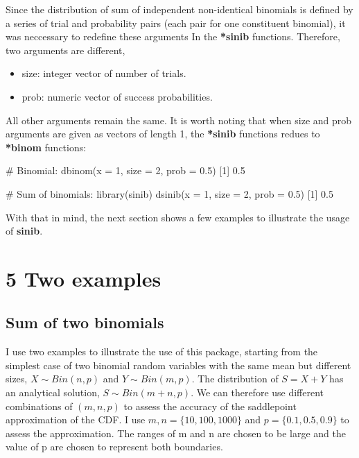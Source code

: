 Since the distribution of sum of independent non-identical binomials is defined by a series of trial and probability pairs (each pair for one constituent binomial), it was neccessary to redefine these arguments  In the \textbf{*sinib} functions. Therefore, two arguments are different,

\begin{itemize}
\item size: integer vector of number of trials. 
\item prob: numeric vector of success probabilities.
\end{itemize}

All other arguments remain the same. It is worth noting that when size and prob arguments are given as vectors of length 1, the \textbf{*sinib} functions redues to \textbf{*binom} functions: 

\begin{example}
# Binomial:
dbinom(x = 1, size = 2, prob = 0.5)
[1] 0.5


# Sum of binomials:
library(sinib)
dsinib(x = 1, size = 2, prob = 0.5)
[1] 0.5
\end{example}

With that in mind, the next section shows a few examples to illustrate the usage of \textbf{sinib}. 

\section{5 Two examples}
\subsection{Sum of two binomials}
I use two examples to illustrate the use of this package, starting from the simplest case of two binomial random variables with the same mean but different sizes, $X \sim Bin(n,p)$ and $Y \sim Bin(m,p)$. The distribution of $S = X+Y$ has an analytical solution, $S \sim Bin(m+n,p)$. We can therefore use different combinations of $(m,n,p)$ to assess the accuracy of the saddlepoint approximation of the CDF. I use $m,n = \{10, 100, 1000\}$ and $p = \{0.1, 0.5, 0.9\}$ to assess the approximation. The ranges of m and n are chosen to be large and the value of p are chosen to represent both boundaries. 


